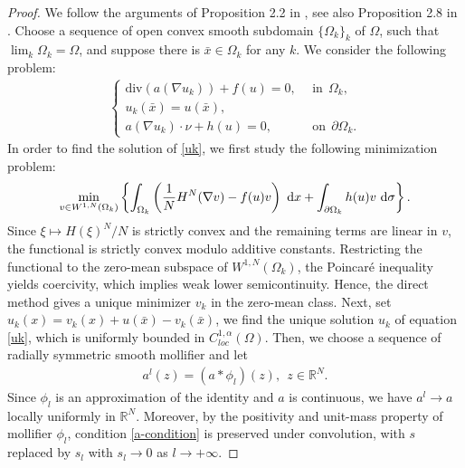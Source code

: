 \documentclass[reqno, 11pt]{amsart} %
\numberwithin{equation}{section}
\theoremstyle{definition}
\newcommand{\pa}{\partial}
\newcommand{\R}{\mathbb{R}}
\newcommand{\dx}{\textup{d}x}
\begin{document}
\begin{proof}
    We follow the arguments of Proposition 2.2 in \cite{CCR2021}, see also Proposition 2.8 in \cite{CFR2020}. Choose a sequence of open convex smooth subdomain $\{\Omega_k\}_k$ of $\Omega$, such that $\lim_k \Omega_k = \Omega$, and suppose there is $\bar{x} \in \Omega_k$ for any $k$. We consider the following problem:
    \begin{align}\label{uk}
        \begin{cases}
            \text{div} (a(\nabla u_k )) + f(u) = 0, \ \ & \text{in} \ \ \Omega_k, \\
            u_k(\bar{x}) = u(\bar{x}), \\
            a(\nabla u_k) \cdot \nu + h(u) = 0, \ \ & \text{on} \ \ \pa \Omega_k.
        \end{cases}
    \end{align}
  In order to find the solution of \eqref{uk}, we first study the following minimization problem:
    \begin{align*}
        \min\limits_{v \in W^{1,N}(\Omega_k)} \left\{ \int_{\Omega_k} \left( \frac{1}{N}H^N(\nabla v) - f(u)v \right) \ \dx + \int_{\pa \Omega_k} h(u) v \ \text{d} \sigma \right\}.
    \end{align*}
    Since $\xi\mapsto H(\xi)^N/N$ is strictly convex and the remaining terms are linear in $v$, the functional is strictly convex modulo additive constants. Restricting the functional to the zero-mean subspace of $W^{1,N}(\Omega_k)$, the Poincaré inequality yields coercivity, which implies weak lower semicontinuity. Hence, the direct method gives a unique minimizer $v_k$ in the zero-mean class. Next, set $u_k(x) = v_k(x) + u(\bar{x}) - v_k(\bar{x})$, we find the unique solution $u_k$ of equation \eqref{uk}, which is uniformly bounded in $C^{1,\alpha}_{loc}(\Omega)$. Then, we choose a sequence of radially symmetric smooth mollifier and let
    \begin{align*}
        a^l(z) = (a * \phi_l)(z), \ \ z \in \R^N.
    \end{align*}
     Since ${\phi_l}$ is an approximation of the identity and $a$ is continuous, we have $a^l \to a$ locally uniformly in $\mathbb R^N$. Moreover, by the positivity and unit-mass property of mollifier $\phi_l$, condition \eqref{a-condition} is preserved under convolution, with $s$ replaced by $s_l$ with $s_l  \to 0$ as $l \to +\infty$.
      

\end{proof}
\end{document}
